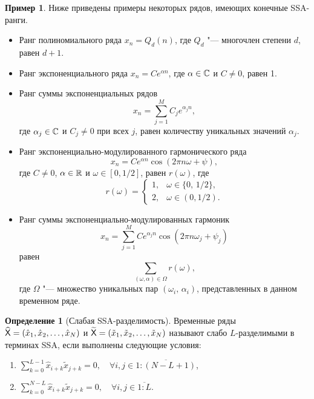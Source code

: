 \documentclass[specialist,
  substylefile=spbu_report.rtx,
subf,href,colorlinks=true, 12pt]{disser}
\theoremstyle{plain}
\theoremstyle{definition}
\newtheorem{definition}{Определение}[section]
\newtheorem{example}{Пример}[section]
\theoremstyle{remark}
\begin{document}
\begin{example}
  \label{ex:ssa-ranks}
  Ниже приведены примеры некоторых рядов, имеющих конечные SSA-ранги.
  \begin{itemize}
    \item Ранг полиномиального ряда $x_n = Q_d(n)$, где $Q_d$ "--- многочлен степени $d$, равен $d + 1$.
    \item Ранг экспоненциального ряда $x_n = C e^{\alpha n}$, где $\alpha \in \mathbb{C}$ и $C \ne 0$, равен 1.
    \item Ранг суммы экспоненциальных рядов
      \[
        x_n = \sum_{j=1}^{M} C_j e^{\alpha_j n},
      \]
      где $\alpha_j \in \mathbb{C}$ и $C_j \ne 0$ при всех $j$, равен количеству уникальных
      значений $\alpha_j$.
    \item Ранг экспоненциально-модулированного гармонического ряда
      \[
        x_n = C e^{\alpha n}\cos(2 \pi n \omega + \psi),
      \]
      где $C \ne 0$, $\alpha \in \mathbb{R}$ и $\omega \in [0,1/2]$,
      равен $r(\omega)$, где
      \begin{equation}
        \label{eq:cos-rank}
        r(\omega) =
        \begin{cases}
          1, & \omega \in \{0,\, 1/2\},\\
          2, & \omega \in (0, 1/2).
        \end{cases}
      \end{equation}
    \item Ранг суммы экспоненциально-модулированных гармоник
      \[
        x_n = \sum_{j=1}^{M} C e^{\alpha_j n}\cos(2 \pi n \omega_j + \psi_j)
      \]
      равен
      \begin{equation*}
        \label{eq:cos-sum-rank}
        \sum_{(\omega, \alpha)\in \Omega} r(\omega),
      \end{equation*}
      где $\Omega$ "--- множество уникальных пар $(\omega_i,\, \alpha_i)$, представленных в данном временном ряде.
  \end{itemize}
\end{example}

\begin{definition}[Слабая SSA-разделимость]
  \label{def:ssa-separability}
  Временные ряды $\widehat{\mathsf{X}} = (\hat{x}_1, \hat{x}_2, \ldots, \hat{x}_N)$ и
  $\widetilde{\mathsf{X}} = (\tilde{x}_1, \tilde{x}_2, \ldots, \tilde{x}_N)$ называют слабо $L$-разделимыми в терминах
  SSA, если выполнены следующие условия:
  \begin{enumerate}
    \item $\displaystyle \sum_{k=0}^{L - 1} \hat{x}_{i + k}\tilde{x}_{j + k} = 0,
      \quad \forall i, j \in \overline{1:(N - L + 1)}$,
    \item $\displaystyle \sum_{k=0}^{N - L} \hat{x}_{i + k}\tilde{x}_{j + k} = 0,
      \quad \forall i, j \in \overline{1:L}$.
  \end{enumerate}
\end{definition}
\end{document}
